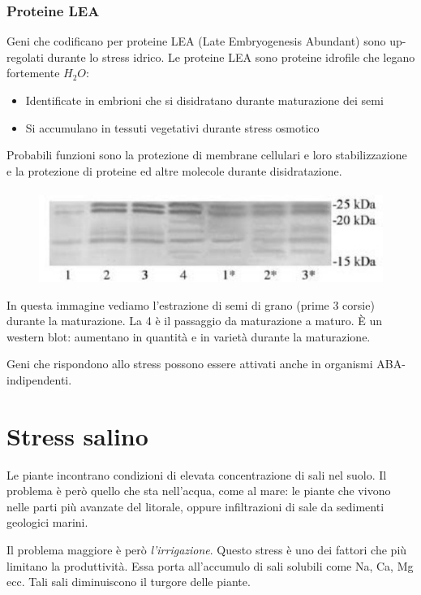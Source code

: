 \documentclass[a4paper,12pt]{book}
\begin{document}
\subsubsection{Proteine LEA}
Geni che codificano per proteine LEA (Late Embryogenesis Abundant) sono up-regolati durante lo stress idrico. Le proteine LEA sono proteine idrofile che legano fortemente $H_{2}O$:
\begin{itemize}
\item{Identificate in embrioni che si disidratano
durante maturazione dei semi}
\item{Si accumulano in tessuti vegetativi durante
stress osmotico}
\end{itemize}
Probabili funzioni sono la protezione di membrane cellulari e loro
stabilizzazione e la protezione di proteine ed altre molecole
durante disidratazione.


\paragraph{}
\begin{figure}[H]
\centering
\includegraphics[scale=.4]{immagini/EF.jpg}
\end{figure}
In questa immagine vediamo l'estrazione di semi di grano (prime 3 corsie) durante la maturazione. La 4  è il passaggio da maturazione a maturo. È un western blot: aumentano in quantità e in varietà durante la maturazione.

Geni che rispondono allo stress possono essere attivati anche in organismi ABA-indipendenti.

\section{Stress salino}
Le piante incontrano condizioni di elevata concentrazione di sali nel suolo. Il problema è però quello che sta nell'acqua, come al mare: le piante che vivono nelle parti più avanzate del litorale, oppure infiltrazioni di sale da sedimenti geologici marini.

Il problema maggiore è però \emph{l'irrigazione}. Questo stress è uno dei fattori che più limitano la produttività. Essa porta all'accumulo di sali solubili come Na, Ca, Mg ecc. Tali sali diminuiscono il turgore delle piante.
\end{document}

